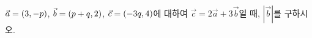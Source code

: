 $\vec{a}=(3{,}\mkern3mu\mathopen{}-p)$, $\vec{b}=(p+q{,}\mkern3mu\mathopen{}2)$, $\vec{c}=(-3q{,}\mkern3mu\mathopen{}4)$에 대하여 $\vec{c}=2\vec{a}+3\vec{b}$일 때, $|\vec{b}|$를 구하시오.
